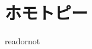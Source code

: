 \documentclass[uplatex]{jsarticle}
\begin{document}
\fi

\section{ホモトピー}

\expandafter\ifx\csname readornot\endcsname\relax
  
\end{document}
